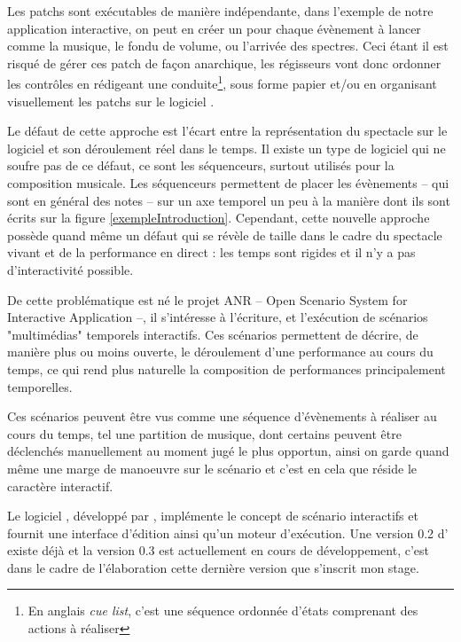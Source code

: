 Les patchs sont exécutables de manière indépendante, dans l'exemple de notre application interactive, on peut en créer un pour chaque évènement à lancer comme la musique, le fondu de volume, ou l'arrivée des spectres. Ceci étant il est risqué de gérer ces patch de façon anarchique, les régisseurs vont donc ordonner les contrôles en rédigeant une conduite\footnote{En anglais \emph{cue list}, c'est une séquence ordonnée d'états comprenant des actions à réaliser}, sous forme papier et/ou en organisant visuellement les patchs sur le logiciel .


Le défaut de cette approche est l'écart entre la représentation du spectacle sur le logiciel et son déroulement réel dans le temps.
%
Il existe un type de logiciel qui ne soufre pas de ce défaut, ce sont les séquenceurs, surtout utilisés pour la composition musicale. Les séquenceurs permettent de placer les évènements -- qui sont en général des notes -- sur un axe temporel un peu à la manière dont ils sont écrits sur la figure \ref{exempleIntroduction}. Cependant, cette nouvelle approche possède quand même un défaut qui se révèle de taille dans le cadre du spectacle vivant et de la performance en direct : les temps sont rigides et il n'y a pas d'interactivité possible.


De cette problématique est né le projet ANR \ossia{} -- Open Scenario System for Interactive Application --, il s'intéresse à l'écriture, et l'exécution de scénarios "multimédias" temporels interactifs. Ces scénarios permettent de décrire, de manière plus ou moins ouverte, le déroulement d'une performance au cours du temps, ce qui rend plus naturelle la composition de performances principalement temporelles.


Ces scénarios peuvent être vus comme une séquence d'évènements à réaliser au cours du temps, tel une partition de musique, dont certains peuvent être déclenchés manuellement au moment jugé le plus opportun, ainsi on garde quand même une marge de manoeuvre sur le scénario et c'est en cela que réside le caractère interactif.

Le logiciel \iscore{}, développé par \ossia{}, implémente le concept de scénario interactifs et fournit une interface d'édition ainsi qu'un moteur d'exécution. Une version 0.2 d'\iscore{} existe déjà et la version 0.3 est actuellement en cours de développement, c'est dans le cadre de l'élaboration cette dernière version que s'inscrit mon stage. 



